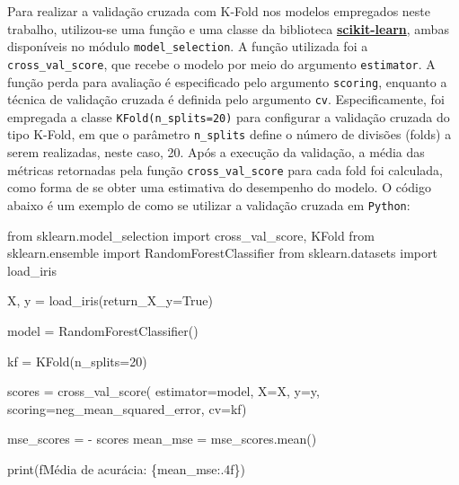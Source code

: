 \documentclass[
  12pt,
  a4paper,
]{scrreprt}
\newenvironment{Shaded}{}{}
\newcommand{\BuiltInTok}[1]{\textcolor[rgb]{0.84,0.23,0.29}{#1}}
\newcommand{\DecValTok}[1]{\textcolor[rgb]{0.00,0.36,0.77}{#1}}
\newcommand{\ImportTok}[1]{\textcolor[rgb]{0.01,0.18,0.38}{#1}}
\newcommand{\NormalTok}[1]{\textcolor[rgb]{0.14,0.16,0.18}{#1}}
\newcommand{\OperatorTok}[1]{\textcolor[rgb]{0.14,0.16,0.18}{#1}}
\newcommand{\SpecialCharTok}[1]{\textcolor[rgb]{0.00,0.36,0.77}{#1}}
\newcommand{\SpecialStringTok}[1]{\textcolor[rgb]{0.01,0.18,0.38}{#1}}
\newcommand{\StringTok}[1]{\textcolor[rgb]{0.01,0.18,0.38}{#1}}
\newcommand{\VariableTok}[1]{\textcolor[rgb]{0.89,0.38,0.04}{#1}}
\begin{document}
Para realizar a validação cruzada com K-Fold nos modelos empregados
neste trabalho, utilizou-se uma função e uma classe da biblioteca
\href{https://scikit-learn.org/stable/}{\textbf{scikit-learn}}, ambas
disponíveis no módulo \texttt{model\_selection}. A função utilizada foi
a \texttt{cross\_val\_score}, que recebe o modelo por meio do argumento
\texttt{estimator}. A função perda para avaliação é especificado pelo
argumento \texttt{scoring}, enquanto a técnica de validação cruzada é
definida pelo argumento \texttt{cv}. Especificamente, foi empregada a
classe \texttt{KFold(n\_splits=20)} para configurar a validação cruzada
do tipo K-Fold, em que o parâmetro \texttt{n\_splits} define o número de
divisões (folds) a serem realizadas, neste caso, 20. Após a execução da
validação, a média das métricas retornadas pela função
\texttt{cross\_val\_score} para cada fold foi calculada, como forma de
se obter uma estimativa do desempenho do modelo. O código abaixo é um
exemplo de como se utilizar a validação cruzada em \texttt{Python}:

\begin{Shaded}
\begin{Highlighting}[]
\ImportTok{from}\NormalTok{ sklearn.model\_selection }\ImportTok{import}\NormalTok{ cross\_val\_score, KFold}
\ImportTok{from}\NormalTok{ sklearn.ensemble }\ImportTok{import}\NormalTok{ RandomForestClassifier}
\ImportTok{from}\NormalTok{ sklearn.datasets }\ImportTok{import}\NormalTok{ load\_iris}

\NormalTok{X, y }\OperatorTok{=}\NormalTok{ load\_iris(return\_X\_y}\OperatorTok{=}\VariableTok{True}\NormalTok{)}

\NormalTok{model }\OperatorTok{=}\NormalTok{ RandomForestClassifier()}

\NormalTok{kf }\OperatorTok{=}\NormalTok{ KFold(n\_splits}\OperatorTok{=}\DecValTok{20}\NormalTok{)}

\NormalTok{scores }\OperatorTok{=}\NormalTok{ cross\_val\_score(}
\NormalTok{  estimator}\OperatorTok{=}\NormalTok{model,}
\NormalTok{  X}\OperatorTok{=}\NormalTok{X, y}\OperatorTok{=}\NormalTok{y,}
\NormalTok{  scoring}\OperatorTok{=}\StringTok{\textquotesingle{}neg\_mean\_squared\_error\textquotesingle{}}\NormalTok{,}
\NormalTok{  cv}\OperatorTok{=}\NormalTok{kf)}

\NormalTok{mse\_scores }\OperatorTok{=} \OperatorTok{{-}}\NormalTok{ scores}
\NormalTok{mean\_mse }\OperatorTok{=}\NormalTok{ mse\_scores.mean()}

\BuiltInTok{print}\NormalTok{(}\SpecialStringTok{f\textquotesingle{}Média de acurácia: }\SpecialCharTok{\{}\NormalTok{mean\_mse}\SpecialCharTok{:.4f\}}\SpecialStringTok{\textquotesingle{}}\NormalTok{)}
\end{Highlighting}
\end{Shaded}
\end{document}
